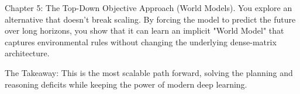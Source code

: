 Chapter 5: The Top-Down Objective Approach (World Models). You explore an alternative that doesn't break scaling. By forcing the model to predict the future over long horizons, you show that it can learn an implicit "World Model" that captures environmental rules without changing the underlying dense-matrix architecture.

The Takeaway: This is the most scalable path forward, solving the planning and reasoning deficits while keeping the power of modern deep learning.
